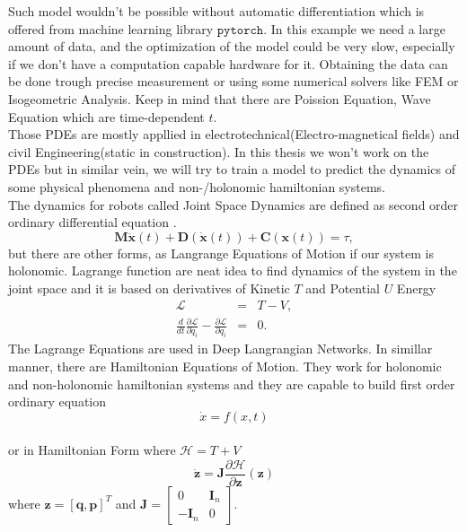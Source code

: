 Such model wouldn't be possible without automatic differentiation\cite{autodiff} which is offered from machine learning library $\texttt{pytorch}$\cite{pytorch}. In this example we need a large amount of data, and the optimization of the model could be very slow, especially if we don't have a computation capable hardware for it. Obtaining the data can be done trough precise measurement or using some numerical solvers like FEM\cite{fem} or Isogeometric Analysis\cite{iga}. Keep in mind that there are Poission Equation, Wave Equation which are time-dependent $t$.\\
Those PDEs are mostly appllied in electrotechnical(Electro-magnetical fields) and  civil Engineering(static in construction).
In this thesis we won't work on the PDEs but in similar vein, we will try to train a model to predict the dynamics of some physical phenomena and non-/holonomic hamiltonian systems.\\
The dynamics for robots called Joint Space Dynamics are defined as second order ordinary differential equation\cite{jointspace} .
\begin{equation}
	\mathbf{M}\ddot{\mathbf{x}}(t) + \mathbf{D}(\dot{\mathbf{x}}(t)) + \mathbf{C}(\mathbf{x}(t))=\tau,
\end{equation} but there are other forms, as Langrange Equations of Motion if our system is holonomic\cite{holo}. Lagrange function are neat idea to find dynamics of the system in the joint space and it is  based on derivatives of Kinetic $T$ and Potential $U$ Energy
\begin{eqnarray}
	\mathcal{L} &=& T - V,\\
	\frac{d}{dt}\frac{\partial \mathcal{L}}{\partial \dot{q}_i} - \frac{\partial \mathcal{L}}{\partial q_i}&=&0.
\end{eqnarray}   
The Lagrange Equations are used in Deep Langrangian Networks\cite{delan}. In simillar manner, there are Hamiltonian Equations of Motion.
They work for holonomic and non-holonomic hamiltonian systems and they are capable to build first order ordinary equation
\begin{equation}
	\dot{x} = f(x,t)
\end{equation} \\
or in Hamiltonian Form where $\mathcal{H} = T + V$
\begin{equation}
	\dot{\mathbf{z}} = \mathbf{J}\frac{\partial\mathcal{H}}{\partial \mathbf{z}}(\mathbf{z})
\end{equation} where $\mathbf{z}=[\mathbf{q},\mathbf{p}]^T$ and $\mathbf{J} = \begin{bmatrix}
0 & \mathbf{I}_n\\
-\mathbf{I}_n & 0
\end{bmatrix}.$\\
